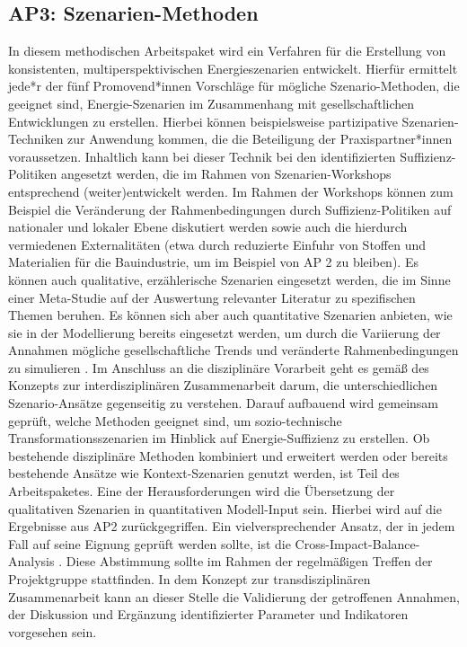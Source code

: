 \documentclass[a4paper,11pt,twoside]{scrartcl}
\begin{document}
\subsection*{AP3: Szenarien-Methoden}
In diesem methodischen Arbeitspaket wird ein Verfahren für die Erstellung von konsistenten, multiperspektivischen Energieszenarien entwickelt. Hierfür ermittelt jede*r der fünf Promovend*innen Vorschläge für mögliche Szenario-Methoden, die geeignet sind, Energie-Szenarien im Zusammenhang mit gesellschaftlichen Entwicklungen zu erstellen. %
Hierbei können beispielsweise partizipative Szenarien-Techniken zur Anwendung kommen, die die Beteiligung der Praxispartner*innen voraussetzen. 
Inhaltlich kann bei dieser Technik bei den identifizierten Suffizienz-Politiken angesetzt werden, die im Rahmen von Szenarien-Workshops entsprechend (weiter)entwickelt werden. Im Rahmen der Workshops können zum Beispiel die Veränderung der Rahmenbedingungen durch Suffizienz-Politiken auf nationaler und lokaler Ebene diskutiert werden sowie auch die hierdurch vermiedenen Externalitäten (etwa durch reduzierte Einfuhr von Stoffen und Materialien für die Bauindustrie, um im Beispiel von AP 2 zu bleiben). Es können auch qualitative, erzählerische Szenarien eingesetzt werden, die im Sinne einer Meta-Studie auf der Auswertung relevanter Literatur zu spezifischen Themen beruhen. Es können sich aber auch quantitative Szenarien anbieten, wie sie in der Modellierung bereits eingesetzt werden, um  durch die Variierung der Annahmen mögliche gesellschaftliche Trends und veränderte Rahmenbedingungen zu simulieren \cite{Bierwirth2016}. 
Im Anschluss an die disziplinäre Vorarbeit geht es gemäß des Konzepts zur interdisziplinären Zusammenarbeit darum, die unterschiedlichen Szenario-Ansätze gegenseitig zu verstehen. Darauf aufbauend wird gemeinsam geprüft, welche Methoden geeignet sind, um sozio-technische Transformationsszenarien im Hinblick auf Energie-Suffizienz zu erstellen. Ob bestehende disziplinäre Methoden kombiniert und erweitert werden oder bereits bestehende Ansätze wie Kontext-Szenarien genutzt werden, ist Teil des Arbeitspaketes. Eine der Herausforderungen wird die Übersetzung der qualitativen Szenarien in quantitativen Modell-Input sein. Hierbei wird auf die Ergebnisse aus AP2 zurückgegriffen. Ein vielversprechender Ansatz, der in jedem Fall auf seine Eignung geprüft werden sollte, ist die Cross-Impact-Balance-Analysis \cite{WEIMERJEHLE2016}. Diese Abstimmung sollte im Rahmen der regelmäßigen Treffen der Projektgruppe stattfinden.
In dem Konzept zur transdisziplinären Zusammenarbeit kann an dieser Stelle die Validierung der getroffenen Annahmen, der Diskussion und Ergänzung identifizierter Parameter und Indikatoren vorgesehen sein.
\end{document}
